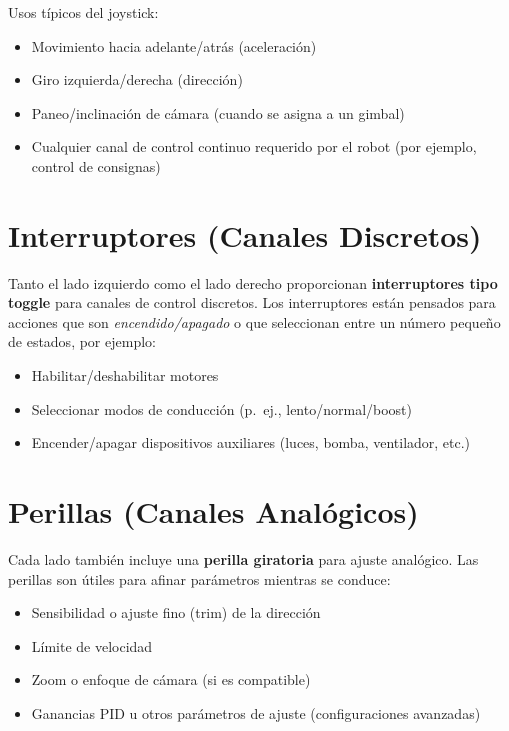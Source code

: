 Usos típicos del joystick:

\begin{itemize}
    \item Movimiento hacia adelante/atrás (aceleración)
    \item Giro izquierda/derecha (dirección)
    \item Paneo/inclinación de cámara (cuando se asigna a un gimbal)
    \item Cualquier canal de control continuo requerido por el robot (por ejemplo, control de consignas)
\end{itemize}

\section{Interruptores (Canales Discretos)}
\label{sec:switches}

Tanto el lado izquierdo como el lado derecho proporcionan \textbf{interruptores tipo toggle} para canales de control discretos. Los interruptores están pensados para acciones que son \textit{encendido/apagado} o que seleccionan entre un número pequeño de estados, por ejemplo:

\begin{itemize}
    \item Habilitar/deshabilitar motores
    \item Seleccionar modos de conducción (p.\ ej., lento/normal/boost)
    \item Encender/apagar dispositivos auxiliares (luces, bomba, ventilador, etc.)
\end{itemize}

\section{Perillas (Canales Analógicos)}
\label{sec:knobs}

Cada lado también incluye una \textbf{perilla giratoria} para ajuste analógico. Las perillas son útiles para afinar parámetros mientras se conduce:

\begin{itemize}
    \item Sensibilidad o ajuste fino (trim) de la dirección
    \item Límite de velocidad
    \item Zoom o enfoque de cámara (si es compatible)
    \item Ganancias PID u otros parámetros de ajuste (configuraciones avanzadas)
\end{itemize}


